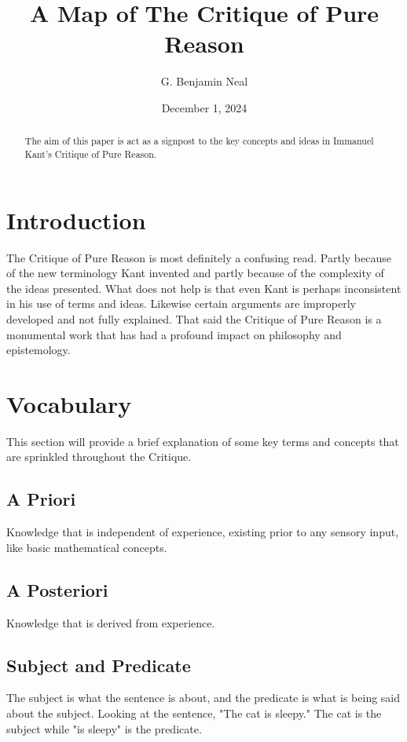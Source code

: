 \documentclass[a4paper]{article}
\begin{document}
\title{A Map of The Critique of Pure Reason}
\author{G. Benjamin Neal}
\date{December 1, 2024}
\maketitle

\begin{abstract}
The aim of this paper is act as a signpost to the key concepts and ideas in Immanuel Kant's Critique of Pure Reason.
\end{abstract}

\section{Introduction}
The Critique of Pure Reason is most definitely a confusing read. 
Partly because of the new terminology Kant invented and partly because of the complexity of the ideas presented.
What does not help is that even Kant is perhaps inconsistent in his use of terms and ideas.
Likewise certain arguments are improperly developed and not fully explained.
That said the Critique of Pure Reason is a monumental work that has had a profound impact on philosophy and epistemology.


\section{Vocabulary}
This section will provide a brief explanation of some key terms and concepts that are sprinkled throughout the Critique.

\subsection{A Priori}
Knowledge that is independent of experience, existing prior to any sensory input, like basic mathematical concepts.

\subsection{A Posteriori}
Knowledge that is derived from experience.

\subsection{Subject and Predicate}
The subject is what the sentence is about, and the predicate is what is being said about the subject.
Looking at the sentence, "The cat is sleepy."
The cat is the subject while "is sleepy" is the predicate.
\end{document}
